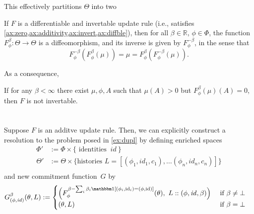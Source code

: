 \documentclass{article}
\def\cofunc{commitment function}
\begin{document}
This effectively partitions $\Theta$ into two


\begin{prop}
	If $F$ is a differentiable and invertable update rule (i.e., satisfies \cref{ax:zero,ax:additivity,ax:invert,ax:diffble}), then for all $\beta \in \mathbb R$, $\phi \in \Phi$, the function
	$F^\beta_\phi : \Theta \to \Theta$
	is a diffeomorphism, and its inverse is given by $F^{-\beta}_\phi$, in the sense that
	\[
		F^{-\beta}_\phi( F^{\beta}_\phi (\mu) ) = \mu = F^{\beta}_\phi( F^{-\beta}_\phi (\mu) ).
	 \]
\end{prop}




As a consequence,
\begin{coro}
	If for any $\beta < \infty$ there exist $\mu, \phi, A$ such that
	$\mu(A) > 0$  but $F^{\beta}_\phi(\mu)(A) = 0$, then $F$ is not invertable.
\end{coro}



\section{}
\begin{example}\label{ex:dupl-enriched}
Suppose $F$ is an additve update rule. Then, we can explicitly construct a resolution to the problem posed in \cref{ex:dupl} by defining enriched spaces
\begin{align*}
	\Phi' &:= \Phi \times \Big\{ \text{ identities }~ \mathit{id}~ \Big\}\\
	\Theta' &:= \Theta \times 
		\Big\{ \text{histories } L = [(\phi_1, \mathit{id}_1, c_1), \ldots (\phi_n, \mathit{id}_n, c_n)] \Big\} \\
\end{align*}
and new \cofunc\ $G$ by 
\begin{align*}
	 G^{\beta}_{(\phi,\mathit{id})}(\theta, L) & := 
		\begin{cases}
		\Big( F^{\beta- \sum_{i}\beta_i \mathbbm1[(\phi_i,\mathrm{id}_i) = (\phi, \mathrm{id})]}_{\phi}(\theta),~
			 L :: (\phi,\mathit{id}, \beta) 
		 \Big)
			 &\text{ if } \beta \ne \bot \\
		(\theta, L) & 
			   \text{ if } \beta = \bot
	\end{cases} 
\end{align*} 
\end{example}
\end{document}
